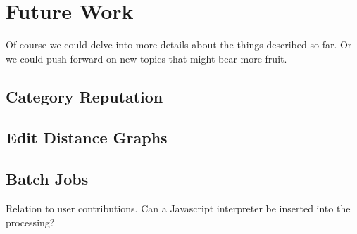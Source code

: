 \section{Future Work}

Of course we could delve into more details about
the things described so far.  Or we could push forward
on new topics that might bear more fruit.

\subsection{Category Reputation}
\subsection{Edit Distance Graphs}

\subsection{Batch Jobs}

    Relation to user contributions.
    Can a Javascript interpreter be inserted into the processing?


